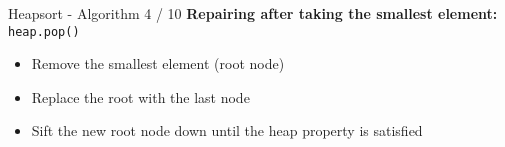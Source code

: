 \begin{frame}{Heapsort - Algorithm 4 / 10}
  \textbf{Repairing after taking the smallest element:} \texttt{heap.pop()}
  \begin{itemize}
    \item<2- |handout:1>
      Remove the smallest element (root node)
    \item<3- |handout:1>
      Replace the root with the last node
    \item<4- |handout:1>
      {\color{MainA}Sift} the new root node down until the
      {\color{MainA}heap property} is satisfied
  \end{itemize}
\end{frame}


